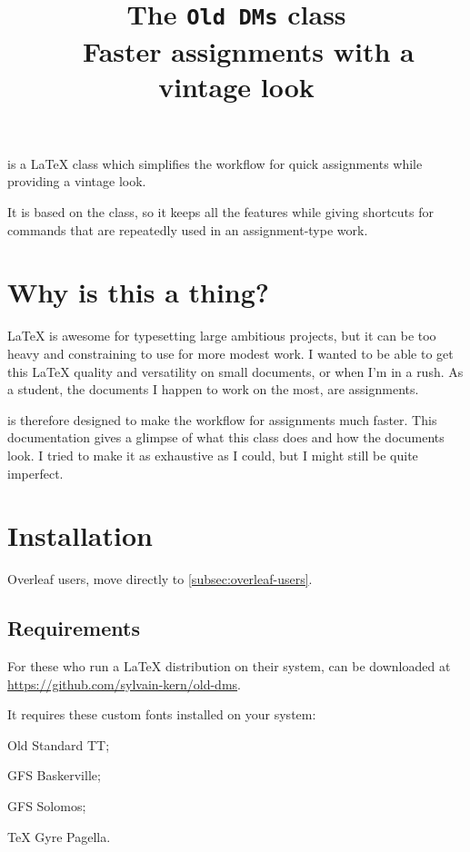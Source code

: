 \documentclass[a4paper, 11pt]{old-dms}
\title{\bfseries \huge The \texttt{Old DMs} class \\~ \vskip -1 \baselineskip \Large Faster assignments with a vintage look}
\date{}
\author{}
\begin{document}
\maketitle

 is a \LaTeX{} class which simplifies the workflow for quick assignments while providing a vintage look.

It is based on the  class, so it keeps all the features while giving shortcuts for commands that are repeatedly used in an assignment-type work.


\setcounter{tocdepth}{2}
\tableofcontents

\newpage


\section*{Why is this a thing?}

\LaTeX{} is awesome for typesetting large ambitious projects, but it can be too heavy and constraining to use for more modest work. I wanted to be able to get this \LaTeX{} quality and versatility on small documents, or when I'm in a rush. As a student, the documents I happen to work on the most, are assignments.

 is therefore designed to make the workflow for assignments much faster. This documentation gives a glimpse of what this class does and how the documents look. I tried to make it as exhaustive as I could, but I might still be quite imperfect.


\section{Installation}

Overleaf users, move directly to \ref{subsec:overleaf-users}.

\subsection{Requirements}

For these who run a \LaTeX{} distribution on their system,  can be downloaded at \url{https://github.com/sylvain-kern/old-dms}. 

It requires these custom fonts installed on your system:
\begin{ul}
    \item Old Standard TT;
    \item GFS Baskerville;
    \item GFS Solomos;
    \item \TeX{} Gyre Pagella.
\end{ul}
\end{document}
